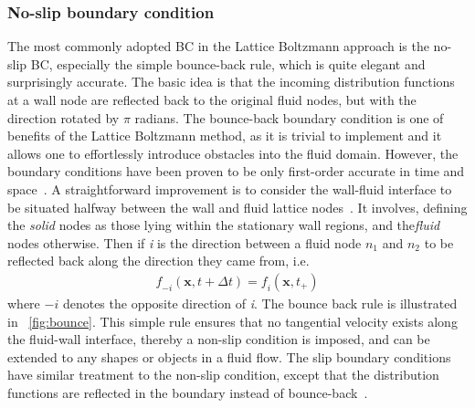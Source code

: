 \subsubsection*{No-slip boundary condition} \label{bounce}
The most commonly adopted BC in the Lattice Boltzmann approach is the no-slip BC, especially the simple bounce-back rule, which is quite elegant and surprisingly accurate. The basic idea is that the incoming distribution functions at a wall node are reflected back to the original fluid nodes, but with the direction rotated by $\pi$ radians. The bounce-back boundary condition is one of benefits of the Lattice Boltzmann method, as it is trivial to implement and it allows one to effortlessly introduce obstacles into the fluid domain. However, the boundary conditions have been proven to be only first-order accurate in time and space~\citep{Pan2006}. A straightforward improvement is to consider the wall-fluid interface to be situated halfway between the wall and fluid lattice nodes~\citep{Ziegler1993}. It involves, defining the \textit{solid} nodes as those lying within the stationary wall regions, and the\textit{fluid} nodes otherwise. Then if \textit{i} is the direction between a fluid node $\mathit{n}_{1}$ and $\mathit{n_2}$ to be reflected back along the direction they came from, i.e.
\begin{eqnarray}
\mathit{f}_{-\mathit{i}}(\mathbf{x}, \mathit{t}+\Delta \mathit{t}) = \mathit{f_i}(\mathbf{x}, \mathit{t}_{+})
\end{eqnarray}
where $-\mathit{i}$ denotes the opposite direction of \textit{i}. The bounce back rule is illustrated in ~\cref{fig:bounce}. This simple rule ensures that no tangential velocity exists along the fluid-wall interface, thereby a non-slip condition is imposed, and can be extended to any shapes or objects in a fluid flow. The slip boundary conditions have similar treatment to the non-slip condition, except that the distribution functions are reflected in the boundary instead of bounce-back~\citep{Succi2001}.
